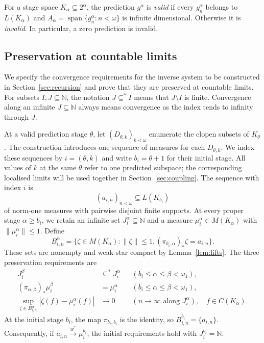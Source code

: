 \documentclass[a4paper,11pt]{amsart}
\theoremstyle{plain}
\theoremstyle{definition}
\theoremstyle{remark}
\newcommand{\N}{\mathbb N}
\newcommand{\Span}{\operatorname{span}}
\numberwithin{equation}{section}
\begin{document}
For a stage space $K_\alpha\subseteq2^\alpha$, the prediction
$g^\alpha$ is \emph{valid} if every $g_n^\alpha$ belongs to
$L(K_\alpha)$ and
$A_\alpha=\Span\{g_n^\alpha:n<\omega\}$ is infinite dimensional.
Otherwise it is \emph{invalid}. In particular, a zero prediction
is invalid.

\subsection{Preservation at countable limits}\label{subsec:countable-limits}

We specify the convergence requirements for the inverse system to be constructed in Section~\ref{sec:recursion} and prove that they are preserved at countable limits.  For subsets $I,J\subseteq\N$, the notation $J\subseteq^*I$ means that $J\setminus I$ is finite.  Convergence along an infinite $J\subseteq\N$ always means convergence as the index tends to infinity through $J$.

At a valid prediction stage $\theta$, let $(D_{\theta,k})_{k<\omega}$
enumerate the clopen subsets of $K_\theta$. The construction introduces
one sequence of measures for each $D_{\theta,k}$.
We index these sequences by $i=(\theta,k)$ and write $b_i=\theta+1$
for their initial stage. All values of $k$ at the same $\theta$ refer
to one predicted subspace; the corresponding localised limits will be
used together in Section~\ref{sec:coupling}.
The sequence with index $i$ is
\[
 (a_{i,n})_{n<\omega}\subseteq L(K_{b_i})
\]
of norm-one measures with pairwise disjoint finite supports.  At every proper stage $\alpha\geqslant b_i$, we retain an infinite set $J_i^\alpha\subseteq\N$ and a measure $\mu_i^\alpha\in M(K_\alpha)$ with $\|\mu_i^\alpha\|\leqslant1$.  Define
\begin{equation}\label{eq:global-lift-sets}
 B_{i,n}^\alpha=
 \{\zeta\in M(K_\alpha):\|\zeta\|\leqslant1,
 (\pi_{b_i,\alpha})_*\zeta=a_{i,n}\}.
\end{equation}
These sets are nonempty and weak-star compact by Lemma~\ref{lem:lifts}.  The three preservation requirements are
\begin{align}
 J_i^\beta&\subseteq^*J_i^\alpha
 &&(b_i\leqslant\alpha\leqslant\beta<\omega_1),
 \label{eq:J-invariant}\\
 (\pi_{\alpha,\beta})_*\mu_i^\beta&=\mu_i^\alpha
 &&(b_i\leqslant\alpha\leqslant\beta<\omega_1),
 \label{eq:mu-invariant}\\
 \sup_{\zeta\in B_{i,n}^\alpha}
 |\zeta(f)-\mu_i^\alpha(f)|&\longrightarrow0
 &&(n\to\infty\text{ along }J_i^\alpha),\quad f\in C(K_\alpha).
 \label{eq:uniform-invariant}
\end{align}
At the initial stage $b_i$, the map $\pi_{b_i,b_i}$ is the identity, so $B_{i,n}^{b_i}=\{a_{i,n}\}$.  Consequently, if $a_{i,n}\xrightarrow{w^*}\mu_i^{b_i}$, the initial requirements hold with $J_i^{b_i}=\N$.
\end{document}
